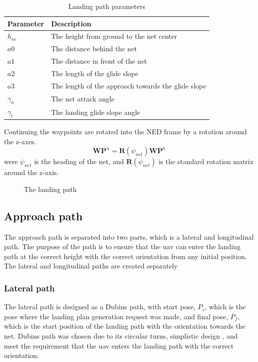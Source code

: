 \begin{table}[H]
\begin{center}
    \begin{tabular}{ | l | l |}
    \hline
    \textbf{Parameter} & \textbf{Description} \\ \hline
    $h_{nc}$ & The height from ground to the net center \\ \hline
    $a0$ & The distance behind the net \\ \hline
    $a1$ & The distance in front of the net \\ \hline
    $a2$ & The length of the glide slope \\ \hline
    $a3$ & The length of the approach towards the glide slope \\ \hline
    $\gamma_n$ & The net attack angle \\ \hline
    $\gamma_l$ & The landing glide slope angle \\ \hline
    \end{tabular}
\end{center}
\caption{Landing path parameters }
\label{Tb:Approach Parameters}
\end{table}
Continuing the waypoints are rotated into the NED frame by a rotation around the z-axes.
\begin{equation}
\mathbf{WP}^n = \mathbf{R}(\psi_{net})\mathbf{WP}^b
\end{equation}
were $\psi_{net}$ is the heading of the net, and $\mathbf{R}(\psi_{net})$ is the standard rotation matrix around the z-axis.
\begin{figure}
\def\svgwidth{\textwidth} %

\caption{The landing path}
\label{Fig:LandingPhase}
\end{figure}

\subsection{Approach path}\label{SS:LandingApproach}
The approach path is separated into two parts, which is a lateral and longitudinal path. The purpose of the path is to ensure that the \gls{uav} can enter the landing path at the correct height with the correct orientation from any initial position. The lateral and longitudinal paths are created separately 
\subsubsection{Lateral path}
The lateral path is designed as a Dubins path, with start pose, $P_s$, which is the pose where the landing plan generation request was made, and final pose, $P_f$, which is the start position of the landing path with the orientation towards the net. Dubins path was chosen due to its circular turns, simplistic design , and meet the requirement that the \gls{uav} enters the landing path with the correct orientation.

